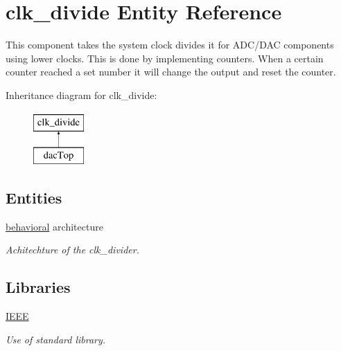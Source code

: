 \hypertarget{classclk__divide}{\section{clk\-\_\-divide Entity Reference}
\label{classclk__divide}
}


This component takes the system clock divides it for A\-D\-C/\-D\-A\-C components using lower clocks. This is done by implementing counters. When a certain counter reached a set number it will change the output and reset the counter.  


Inheritance diagram for clk\-\_\-divide\-:\begin{figure}[H]
\begin{center}
\leavevmode
\includegraphics[height=2.000000cm]{classclk__divide}
\end{center}
\end{figure}
\subsection*{Entities}
\begin{DoxyCompactItemize}
\item 
\hyperlink{classclk__divide_1_1behavioral}{behavioral} architecture
\begin{DoxyCompactList}\small\item\em Achitechture of the clk\-\_\-divider. \end{DoxyCompactList}\end{DoxyCompactItemize}
\subsection*{Libraries}
 \begin{DoxyCompactItemize}
\item 
\hypertarget{classclk__divide_ae4f03c286607f3181e16b9aa12d0c6d4}{\hyperlink{classclk__divide_ae4f03c286607f3181e16b9aa12d0c6d4}{I\-E\-E\-E} }\label{classclk__divide_ae4f03c286607f3181e16b9aa12d0c6d4}

\begin{DoxyCompactList}\small\item\em Use of standard library. \end{DoxyCompactList}\end{DoxyCompactItemize}

